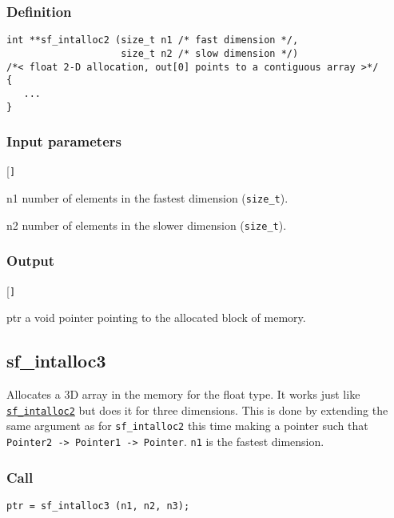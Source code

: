 \subsubsection*{Definition}
\begin{verbatim}
int **sf_intalloc2 (size_t n1 /* fast dimension */, 
                    size_t n2 /* slow dimension */)
/*< float 2-D allocation, out[0] points to a contiguous array >*/  
{
   ...
}
\end{verbatim}

\subsubsection*{Input parameters}
\begin{desclist}{\tt }{\quad}[\tt ]
   \setlength\itemsep{0pt}
   \item[n1] number of elements in the fastest dimension (\texttt{size\_t}).
   \item[n2] number of elements in the slower dimension (\texttt{size\_t}).
\end{desclist}

\subsubsection*{Output}
\begin{desclist}{\tt }{\quad}[\tt ]
   \setlength\itemsep{0pt}
   \item[ptr] a void pointer pointing to the allocated block of memory.
\end{desclist}





\subsection{{sf\_intalloc3}}
Allocates a 3D array in the memory for the float type. It works just like \hyperref[sec:sf_intalloc2]{\texttt{sf\_intalloc2}} but does it for three dimensions. This is done by extending the same argument as for \texttt{sf\_intalloc2} this time making a pointer such that \texttt{Pointer2 -> Pointer1 -> Pointer}. \texttt{n1} is the fastest dimension.

\subsubsection*{Call}
\begin{verbatim}ptr = sf_intalloc3 (n1, n2, n3);\end{verbatim}

